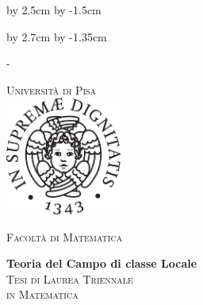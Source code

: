 \advance\vsize by 2.5cm %
\advance\voffset by -1.5cm %


\begin{titlingpage}


\advance\hsize by 2.7cm %
\advance\hoffset by -1.35cm %




\calccentering{\unitlength}
\begin{adjustwidth*}{\unitlength}{-\unitlength}


\thispagestyle{empty}
\begin{center}
\large
\textsc{\Large Università di Pisa\\}
\vspace{0.6cm}
\includegraphics[width=3.8cm]{cherubino.pdf}

\vspace{0.8cm}
\textsc{\Large{Facoltà di Matematica}}\\



\vspace{2.5cm}


{\Huge\textbf{Teoria del Campo di classe Locale}}
\\[2.0cm]

\textsc{Tesi di Laurea Triennale \\[0.2cm] in Matematica}\\
\vspace{0.5cm}

\begin{center}

\end{center}

\vspace{0.2cm}

%
%


\end{center}
\end{adjustwidth*}
\end{titlingpage}

